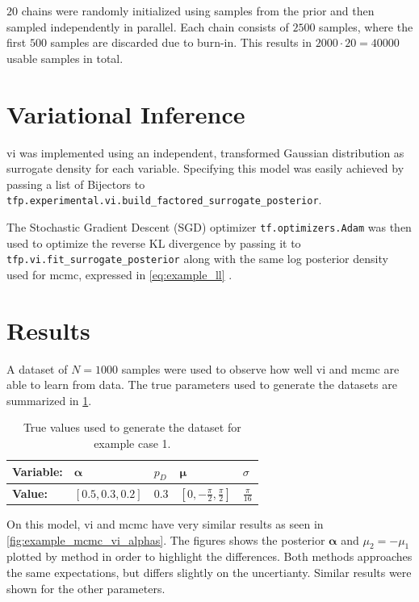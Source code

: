 $20$ chains were randomly initialized using samples from the prior and then sampled independently in parallel. Each chain consists of $2500$ samples, where the first $500$ samples are discarded due to burn-in. This results in $2000 \cdot 20 = 40000$ usable samples in total. 

\section{Variational Inference}

\acrshort{vi} was implemented using an independent, transformed Gaussian distribution as surrogate density for each variable. Specifying this model was easily achieved by passing a list of Bijectors to \texttt{tfp.experimental.vi.build\_factored\_surrogate\_posterior}. 

The Stochastic Gradient Descent (SGD) optimizer \texttt{tf.optimizers.Adam} was then used to optimize the reverse KL divergence by passing it to \texttt{tfp.vi.fit\_surrogate\_posterior} along with the same log posterior density used for \acrshort{mcmc}, expressed in \cref{eq:example_ll} \cite{tensorflow2015-whitepaper}. 

\section{Results}
A dataset of $N=1000$ samples were used to observe how well \acrshort{vi} and \acrshort{mcmc} are able to learn from data. The true parameters used to generate the datasets are summarized in \cref{tbl:example_params}.
\begin{table}[h]
\centering
\begin{tabular}{lllll}
\textbf{Variable:}   & $\boldsymbol{\alpha}$ & $p_D$ & $\boldsymbol{\mu}$                  & $\sigma$         \\ \hline
\textbf{Value:} & $[0.5, 0.3, 0.2]$     & $0.3$ & $[0, -\frac{\pi}{2}, \frac{\pi}{2}]$ & $\frac{\pi}{16}$ \\
\end{tabular}
\caption{True values used to generate the dataset for example case 1.}
\label{tbl:example_params}
\end{table}

On this model, \acrshort{vi} and \acrshort{mcmc} have very similar results as seen in \cref{fig:example_mcmc_vi_alphas}. The figures shows the posterior $\boldsymbol{\alpha}$ and $\mu_2=-\mu_1$ plotted by method in order to highlight the differences. Both methods approaches the same expectations, but differs slightly on the uncertianty. Similar results were shown for the other parameters. 

